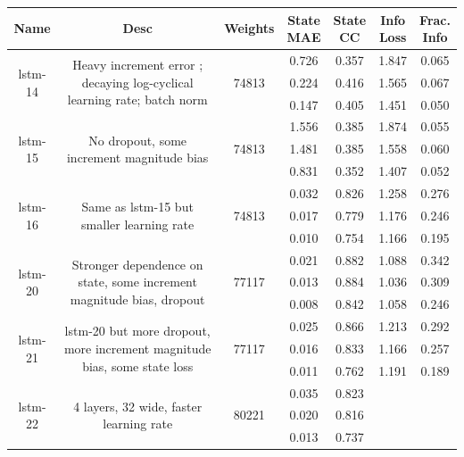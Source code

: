 \begin{table}[h!p]
    \footnotesize
    \centering
\begin{sideways}
    \begin{tabular}{c|c|c|c|c|c|c }
Name & Desc & Weights & \thead{State\\MAE} & \thead{State\\CC} & \thead{Info\\Loss} &\thead{Frac.\\Info}\\
\hline
\multirow{3}{6em}{lstm-14} & \multirow{3}{16em}{Heavy increment error ; decaying log-cyclical learning rate; batch norm} & \multirow{3}{4em}{74813} & 0.726 & 0.357 & 1.847 & 0.065 \\ & & & 0.224 & 0.416 & 1.565 & 0.067 \\ & & & 0.147 & 0.405 & 1.451 & 0.050 \\
\hline
\multirow{3}{6em}{lstm-15} & \multirow{3}{16em}{No dropout, some increment magnitude bias} & \multirow{3}{4em}{74813} & 1.556 & 0.385 & 1.874 & 0.055 \\ & & & 1.481 & 0.385 & 1.558 & 0.060 \\ & & & 0.831 & 0.352 & 1.407 & 0.052 \\
\hline
\multirow{3}{6em}{lstm-16} & \multirow{3}{16em}{Same as lstm-15 but smaller learning rate} & \multirow{3}{4em}{74813} & 0.032 & 0.826 & 1.258 & 0.276 \\ & & & 0.017 & 0.779 & 1.176 & 0.246 \\ & & & 0.010 & 0.754 & 1.166 & 0.195 \\
\hline
\multirow{3}{6em}{lstm-20} & \multirow{3}{16em}{Stronger dependence on state, some increment magnitude bias, dropout} & \multirow{3}{4em}{77117} & 0.021 & 0.882 & 1.088 & 0.342 \\ & & & 0.013 & 0.884 & 1.036 & 0.309 \\ & & & 0.008 & 0.842 & 1.058 & 0.246 \\
\hline
\multirow{3}{6em}{lstm-21} & \multirow{3}{16em}{lstm-20 but more dropout, more increment magnitude bias, some state loss} & \multirow{3}{4em}{77117} & 0.025 & 0.866 & 1.213 & 0.292 \\ & & & 0.016 & 0.833 & 1.166 & 0.257 \\ & & & 0.011 & 0.762 & 1.191 & 0.189 \\
\hline
\multirow{3}{6em}{lstm-22} & \multirow{3}{16em}{4 layers, 32 wide, faster learning rate} & \multirow{3}{4em}{80221} & 0.035 & 0.823 &  &  \\ & & & 0.020 & 0.816 &  &  \\ & & & 0.013 & 0.737 &  &  \\

\end{tabular}
\end{sideways}
\end{table}
